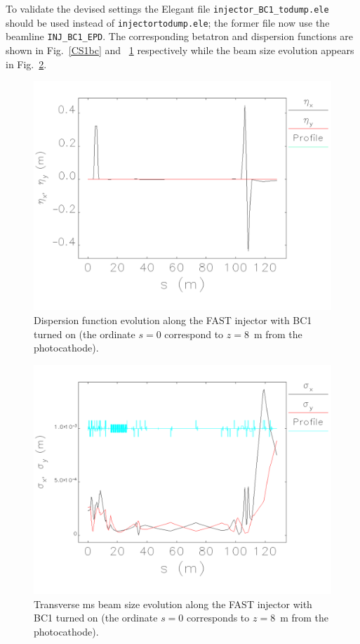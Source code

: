 \documentclass[notitlepage,twocolumn,nofootinbib,showpacs,preprintnumbers,superscriptaddress,amsmath,amssymb]{revtex4-1}
\newcommand{\elegant}{{\sc Elegant }}
\begin{document}
To validate the devised settings the \elegant file {\tt injector\_BC1\_todump.ele}  should be used instead of {\tt injectortodump.ele}; the former file now use the beamline {\tt INJ\_BC1\_EPD}.  The corresponding betatron and dispersion functions are shown in Fig.~\ref{CS1bc} and  ~\ref{CS2bc} respectively while the beam size evolution appears in Fig.~\ref{rmsbc}. 

\begin{figure}[hhhh!!!!!!!!!!!!]
\begin{center}
 \includegraphics[width=0.95\linewidth]{injectortodump_etabc.pdf}
\caption{Dispersion function evolution along the FAST injector with BC1 turned on (the ordinate $s=0$ correspond to $z=8$~m from the photocathode). \label{CS2bc} }
\end{center}
\end{figure}
\begin{figure}[hhhh!!!!!!!!!!]
\begin{center}
\includegraphics[width=0.95\linewidth]{injectortodump_rmsbc.pdf}
\caption{Transverse ms beam size evolution along the FAST injector with BC1 turned on (the ordinate $s=0$ corresponds to $z=8$~m from the photocathode). \label{rmsbc} }
\end{center}
\end{figure}
\end{document}
